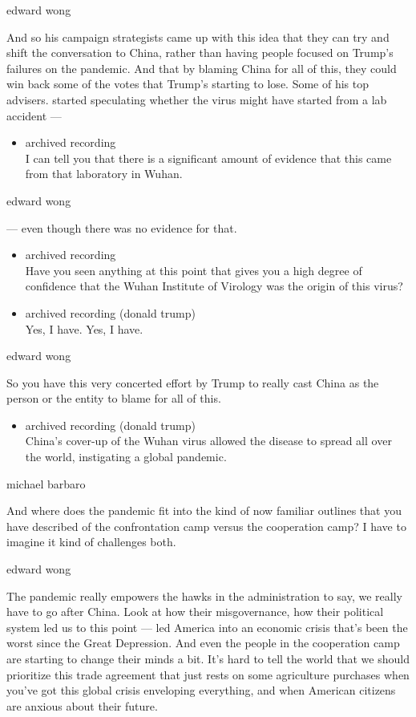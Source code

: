 edward wong

And so his campaign strategists came up with this idea that they can try
and shift the conversation to China, rather than having people focused
on Trump's failures on the pandemic. And that by blaming China for all
of this, they could win back some of the votes that Trump's starting to
lose. Some of his top advisers. started speculating whether the virus
might have started from a lab accident ---

\begin{itemize}
\tightlist
\item
  archived recording\\
  I can tell you that there is a significant amount of evidence that
  this came from that laboratory in Wuhan.
\end{itemize}

edward wong

--- even though there was no evidence for that.

\begin{itemize}
\item
  archived recording\\
  Have you seen anything at this point that gives you a high degree of
  confidence that the Wuhan Institute of Virology was the origin of this
  virus?
\item
  archived recording (donald trump)\\
  Yes, I have. Yes, I have.
\end{itemize}

edward wong

So you have this very concerted effort by Trump to really cast China as
the person or the entity to blame for all of this.

\begin{itemize}
\tightlist
\item
  archived recording (donald trump)\\
  China's cover-up of the Wuhan virus allowed the disease to spread all
  over the world, instigating a global pandemic.
\end{itemize}

michael barbaro

And where does the pandemic fit into the kind of now familiar outlines
that you have described of the confrontation camp versus the cooperation
camp? I have to imagine it kind of challenges both.

edward wong

The pandemic really empowers the hawks in the administration to say, we
really have to go after China. Look at how their misgovernance, how
their political system led us to this point --- led America into an
economic crisis that's been the worst since the Great Depression. And
even the people in the cooperation camp are starting to change their
minds a bit. It's hard to tell the world that we should prioritize this
trade agreement that just rests on some agriculture purchases when
you've got this global crisis enveloping everything, and when American
citizens are anxious about their future.

